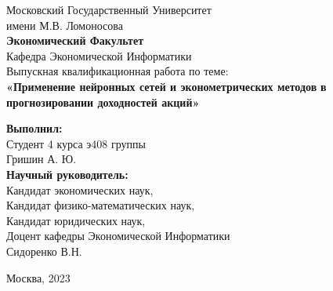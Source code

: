 \begin{center}
	\large{Московский Государственный Университет\\имени М.В. Ломоносова}\\
	\hfill \break
	\normalsize{\textbf{Экономический Факультет}}\\
	\hfill \break
	\normalsize{Кафедра Экономической Информатики}\\
	\hfill \break
	\hfill \break
	\hfill \break
	\hfill \break
	\large{Выпускная квалификационная работа по теме:}\\
	\hfill \break
	\large{\textbf{«Применение нейронных сетей и эконометрических методов} \textbf{в прогнозировании доходностей акций»}}\\
	\hfill \break
\end{center}
\hfill \break
\hfill \break
\hfill \break
\begin{flushright}
	\textbf{Выполнил:}\\
	Студент 4 курса э408 группы\\
	\hfill \break
	Гришин А. Ю.\\
	\hfill \break
	\textbf{Научный руководитель:}\\
	Кандидат экономических наук,\\
	Кандидат физико-математических наук,\\
	Кандидат юридических наук,\\
	Доцент кафедры Экономической Информатики\\
	\hfill \break
	Сидоренко В.Н.
\end{flushright}
\hfill \break
\hfill \break
\hfill \break
\hfill \break
\begin{center} Москва, 2023 \end{center}
\thispagestyle{empty} %

